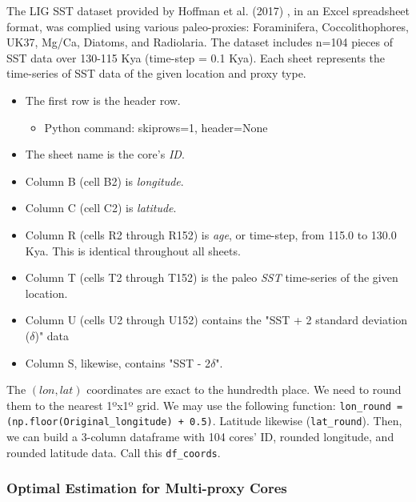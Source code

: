 \documentclass{article}
\begin{document}
The LIG SST dataset provided by Hoffman et al. (2017) \cite{Hoffman2017}, in an Excel spreadsheet format, was complied using various paleo-proxies: Foraminifera, Coccolithophores, UK37, Mg/Ca, Diatoms, and Radiolaria. The dataset includes n=104 pieces of SST data over 130-115 Kya (time-step = 0.1 Kya).
Each sheet represents the time-series of SST data of the given location and proxy type.
\begin{itemize}
    \item The first row is the header row.
    \begin{itemize}
        \item Python command: skiprows=1, header=None
    \end{itemize}
    \item The sheet name is the core's \textit{ID}.
    \item Column B (cell B2) is \textit{longitude}.
    \item Column C (cell C2) is \textit{latitude}.
    \item Column R (cells R2 through R152) is \textit{age}, or time-step, from 115.0 to 130.0 Kya. This is identical throughout all sheets.
    \item Column T (cells T2 through T152) is the paleo \textit{SST} time-series of the given location.
    \item Column U (cells U2 through U152) contains the "SST + 2 standard deviation ($\delta$)" data
    \item Column S, likewise, contains "SST - 2$\delta$".
\end{itemize}
The $(lon,lat)$ coordinates are exact to the hundredth place. We need to round them to the nearest 1ºx1º grid.
We may use the following function:
\texttt{lon\_round = (np.floor(Original\_longitude) + 0.5)}. 
Latitude likewise (\texttt{lat\_round}).
Then, we can build a 3-column dataframe with 104 cores' ID, rounded longitude, and rounded latitude data. Call this \texttt{df\_coords}.

\subsubsection{Optimal Estimation for Multi-proxy Cores}

\end{document}
